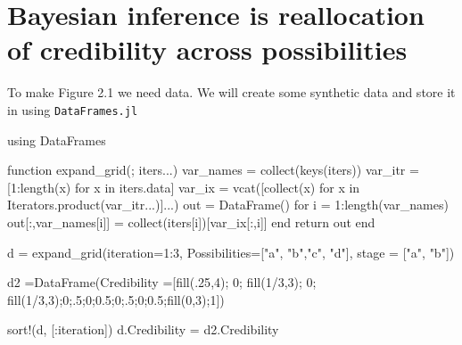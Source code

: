 \documentclass[
  letterpaper,
  DIV=11,
  numbers=noendperiod]{scrreprt}
\newenvironment{Shaded}{\begin{snugshade}}{\end{snugshade}}
\newcommand{\BuiltInTok}[1]{\textcolor[rgb]{0.00,0.23,0.31}{#1}}
\newcommand{\CharTok}[1]{\textcolor[rgb]{0.13,0.47,0.30}{#1}}
\newcommand{\FloatTok}[1]{\textcolor[rgb]{0.68,0.00,0.00}{#1}}
\newcommand{\FunctionTok}[1]{\textcolor[rgb]{0.28,0.35,0.67}{#1}}
\newcommand{\ImportTok}[1]{\textcolor[rgb]{0.00,0.46,0.62}{#1}}
\newcommand{\KeywordTok}[1]{\textcolor[rgb]{0.00,0.23,0.31}{#1}}
\newcommand{\NormalTok}[1]{\textcolor[rgb]{0.00,0.23,0.31}{#1}}
\newcommand{\OperatorTok}[1]{\textcolor[rgb]{0.37,0.37,0.37}{#1}}
\newcommand{\StringTok}[1]{\textcolor[rgb]{0.13,0.47,0.30}{#1}}
\begin{document}
\hypertarget{bayesian-inference-is-reallocation-of-credibility-across-possibilities}{%
\section{Bayesian inference is reallocation of credibility across
possibilities}\label{bayesian-inference-is-reallocation-of-credibility-across-possibilities}}

To make Figure 2.1 we need data. We will create some synthetic data and
store it in using \texttt{DataFrames.jl}

\begin{Shaded}
\begin{Highlighting}[]
\ImportTok{using} \BuiltInTok{DataFrames}

\KeywordTok{function} \FunctionTok{expand\_grid}\NormalTok{(; iters}\OperatorTok{...}\NormalTok{)}
\NormalTok{    var\_names }\OperatorTok{=} \FunctionTok{collect}\NormalTok{(}\FunctionTok{keys}\NormalTok{(iters))}
\NormalTok{    var\_itr }\OperatorTok{=}\NormalTok{ [}\FloatTok{1}\OperatorTok{:}\FunctionTok{length}\NormalTok{(x) for x }\KeywordTok{in}\NormalTok{ iters.data]}
\NormalTok{    var\_ix }\OperatorTok{=} \FunctionTok{vcat}\NormalTok{([}\FunctionTok{collect}\NormalTok{(x)}\CharTok{\textquotesingle{} for x in Iterators.product(var\_itr...)]...)}
\NormalTok{    out }\OperatorTok{=} \FunctionTok{DataFrame}\NormalTok{()}
\NormalTok{    for i }\OperatorTok{=} \FloatTok{1}\OperatorTok{:}\FunctionTok{length}\NormalTok{(var\_names)}
\NormalTok{        out[}\OperatorTok{:}\NormalTok{,var\_names[i]] }\OperatorTok{=} \FunctionTok{collect}\NormalTok{(iters[i])[var\_ix[}\OperatorTok{:}\NormalTok{,i]]}
    \KeywordTok{end}
\NormalTok{    return out}
\KeywordTok{end}

\NormalTok{d }\OperatorTok{=} \FunctionTok{expand\_grid}\NormalTok{(iteration}\OperatorTok{=}\FloatTok{1}\OperatorTok{:}\FloatTok{3}\NormalTok{, Possibilities}\OperatorTok{=}\NormalTok{[}\StringTok{"a"}\NormalTok{, }\StringTok{"b"}\NormalTok{,}\StringTok{"c"}\NormalTok{, }\StringTok{"d"}\NormalTok{], stage }\OperatorTok{=}\NormalTok{ [}\StringTok{"a"}\NormalTok{, }\StringTok{"b"}\NormalTok{])}

\NormalTok{d2 }\OperatorTok{=}\FunctionTok{DataFrame}\NormalTok{(Credibility }\OperatorTok{=}\NormalTok{[}\FunctionTok{fill}\NormalTok{(}\FloatTok{.25}\NormalTok{,}\FloatTok{4}\NormalTok{); }\FloatTok{0}\NormalTok{; }\FunctionTok{fill}\NormalTok{(}\FloatTok{1}\OperatorTok{/}\FloatTok{3}\NormalTok{,}\FloatTok{3}\NormalTok{); }\FloatTok{0}\NormalTok{; }\FunctionTok{fill}\NormalTok{(}\FloatTok{1}\OperatorTok{/}\FloatTok{3}\NormalTok{,}\FloatTok{3}\NormalTok{);}\FloatTok{0}\NormalTok{;}\FloatTok{.5}\NormalTok{;}\FloatTok{0}\NormalTok{;}\FloatTok{0.5}\NormalTok{;}\FloatTok{0}\NormalTok{;}\FloatTok{.5}\NormalTok{;}\FloatTok{0}\NormalTok{;}\FloatTok{0.5}\NormalTok{;}\FunctionTok{fill}\NormalTok{(}\FloatTok{0}\NormalTok{,}\FloatTok{3}\NormalTok{);}\FloatTok{1}\NormalTok{])}

\FunctionTok{sort!}\NormalTok{(d, [}\OperatorTok{:}\NormalTok{iteration])}
\NormalTok{d.Credibility }\OperatorTok{=}\NormalTok{ d2.Credibility}
\end{Highlighting}
\end{Shaded}
\end{document}

